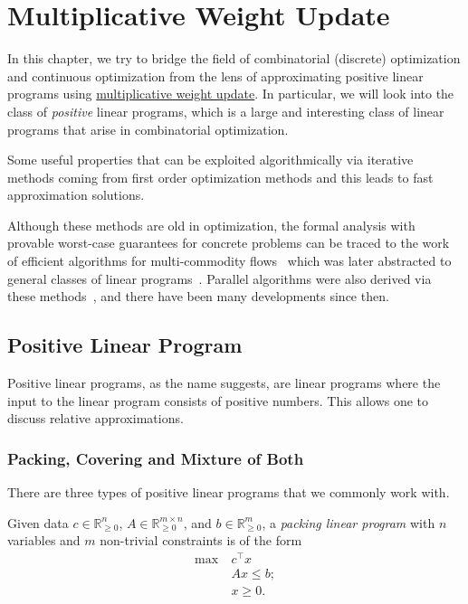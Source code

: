 \chapter{Multiplicative Weight Update}\label{ch:MWU}
In this chapter, we try to bridge the field of combinatorial (discrete) optimization and continuous optimization from the lens of approximating positive linear programs using \hyperref[algo:MWU-discrete-non-uniform]{multiplicative weight update}. In particular, we will look into the class of \emph{positive} linear programs, which is a large and interesting class of linear programs that arise in combinatorial optimization.

\begin{intuition}
	Some useful properties that can be exploited algorithmically via iterative methods coming from first order optimization methods and this leads to fast approximation solutions.
\end{intuition}

Although these methods are old in optimization, the formal analysis with provable worst-case guarantees for concrete problems can be traced to the work of efficient algorithms for multi-commodity flows~\cite{shahrokhi1990maximum} which was later abstracted to general classes of linear programs~\cite{plotkin1995fast,grigoriadis1994fast}. Parallel algorithms were also derived via these methods~\cite{luby1993parallel}, and there have been many developments since then.

\section{Positive Linear Program}
Positive linear programs, as the name suggests, are linear programs where the input to the linear program consists of positive numbers. This allows one to discuss relative approximations.

\subsection{Packing, Covering and Mixture of Both}
There are three types of positive linear programs that we commonly work with.

\begin{definition}\label{def:packing-LP}
	Given data \(c \in \mathbb{R} _{\geq 0}^n\), \(A \in \mathbb{R} _{\geq 0}^{m \times n}\), and \(b \in \mathbb{R} _{\geq 0}^m\), a \emph{packing linear program} with \(n\) variables and \(m\) non-trivial constraints is of the form
	\[
		\begin{aligned}
			\max~ & c^{\top} x  \\
			      & Ax \leq b ; \\
			      & x \geq 0.
		\end{aligned}
	\]
\end{definition}


